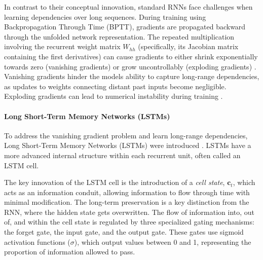In contrast to their conceptual innovation, standard RNNs face challenges when learning dependencies over long sequences. During training using Backpropagation Through Time (BPTT), gradients are propagated backward through the unfolded network representation. The repeated multiplication involving the recurrent weight matrix \( W_{hh} \) (specifically, its Jacobian matrix containing the first derivatives) can cause gradients to either shrink exponentially towards zero (vanishing gradients) or grow uncontrollably (exploding gradients) \autocite{hochreiter1998vanishing}. Vanishing gradients hinder the models ability to capture long-range dependencies, as updates to weights connecting distant past inputs become negligible. Exploding gradients can lead to numerical instability during training \autocite{philipp2017exploding}.

\paragraph{\textbf{Long Short-Term Memory Networks (LSTMs)}}
\label{sec:lstm}

To address the vanishing gradient problem and learn long-range dependencies, Long Short-Term Memory Networks (LSTMs) were introduced \autocite{hochreiter1997long}. LSTMs have a more advanced internal structure within each recurrent unit, often called an LSTM cell.

The key innovation of the LSTM cell is the introduction of a \textit{cell state}, \( \bm{c}_t \), which acts as an information conduit, allowing information to flow through time with minimal modification. The long-term preservation is a key distinction from the RNN, where the hidden state gets overwritten. The flow of information into, out of, and within the cell state is regulated by three specialized gating mechanisms: the forget gate, the input gate, and the output gate. These gates use sigmoid activation functions (\(\sigma\)), which output values between 0 and 1, representing the proportion of information allowed to pass.

